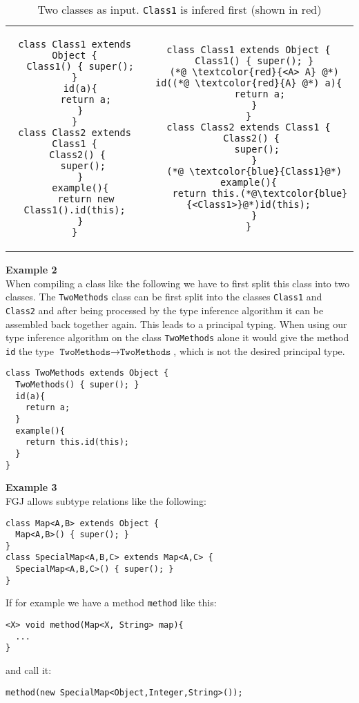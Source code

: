 \begin{table}
\caption{Two classes as input. \texttt{Class1} is infered first (shown in {\color{red}red})}
\begin{tabular}{cc}
\begin{lstlisting}
class Class1 extends Object {
  Class1() { super(); }
  id(a){
    return a;
  }
}
class Class2 extends Class1 {
  Class2() { 
    super(); 
  }
  example(){
    return new Class1().id(this);
  }
}
\end{lstlisting}
&
\begin{lstlisting}
class Class1 extends Object {
  Class1() { super(); }
  (*@ \textcolor{red}{<A> A} @*) id((*@ \textcolor{red}{A} @*) a){
    return a;
  }
}
class Class2 extends Class1 {
  Class2() { 
    super(); 
  }
  (*@ \textcolor{blue}{Class1}@*) example(){
    return this.(*@\textcolor{blue}{<Class1>}@*)id(this);
  }
}
\end{lstlisting}
\end{tabular}
\end{table}

\textbf{Example 2}\\
When compiling a class like the following
we have to first split this class into two classes.
The \texttt{TwoMethods} class can be first split into the classes \texttt{Class1}
and \texttt{Class2} and after being processed by the type inference algorithm it can be assembled back together again.
This leads to a principal typing.
When using our type inference algorithm on the class \texttt{TwoMethods} alone
it would give the method \texttt{id} the type $\texttt{TwoMethods} \to \texttt{TwoMethods}$,
which is not the desired principal type.
\begin{lstlisting}
class TwoMethods extends Object {
  TwoMethods() { super(); }
  id(a){
    return a;
  }
  example(){
    return this.id(this);
  }
}
\end{lstlisting}

\textbf{Example 3}\\
FGJ allows subtype relations like the following:
\begin{lstlisting}
class Map<A,B> extends Object {
  Map<A,B>() { super(); }
}
class SpecialMap<A,B,C> extends Map<A,C> {
  SpecialMap<A,B,C>() { super(); }
}
\end{lstlisting}

If for example we have a method \texttt{method} like this:
\begin{lstlisting}
<X> void method(Map<X, String> map){
  ...
}
\end{lstlisting}
and call it:
\begin{lstlisting}
method(new SpecialMap<Object,Integer,String>());
\end{lstlisting}

